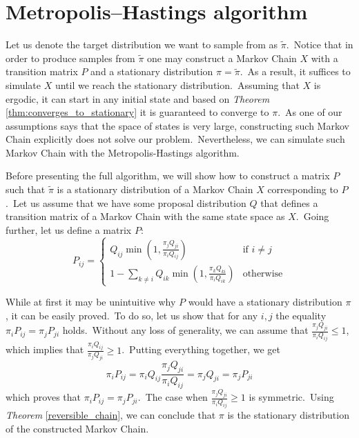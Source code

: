 \documentclass[a4paper, 11pt, onecolumn, openany, titlepage]{report}
\theoremstyle{default_theorem_style}\newtheorem{theorem}{Theorem}
\theoremstyle{default_theorem_style}\newtheorem{definition}{Definition}
\begin{document}
\section{Metropolis–Hastings algorithm}

Let us denote the target distribution we want to sample from as $\tilde{\pi}$.\ Notice that in order to produce samples
from $\tilde{\pi}$ one may construct a Markov Chain $X$ with a transition matrix $P$ and a stationary distribution
$\pi = \tilde{\pi}$.\ As a result, it suffices to simulate $X$ until we reach the stationary distribution.\ Assuming
that $X$ is ergodic, it can start in any initial state and based on \textit{Theorem} \ref{thm:converges_to_stationary}
it is guaranteed to converge to $\pi$.\ As one of our assumptions says that the space of states is very large,
constructing such Markov Chain explicitly does not solve our problem.\ Nevertheless, we can simulate such Markov Chain
with the Metropolis-Hastings algorithm.\newline

Before presenting the full algorithm, we will show how to construct a matrix $P$ such that $\tilde{\pi}$ is a
stationary distribution of a Markov Chain $X$ corresponding to $P$.\ Let us assume that we have some proposal
distribution $Q$ that defines a transition matrix of a Markov Chain with the same state space as $X$.\ Going further,
let us define a matrix $P$:\newline
$$
P_{ij} =
\begin{cases}
  Q_{ij}\min{(1, \frac{\pi_j Q_{ji}}{\pi_i Q_{ij}})} &\text{if $i \ne j$}\\
  1 - \sum\limits_{k \ne i}Q_{ik} \min{(1, \frac{\pi_k Q_{ki}}{\pi_i Q_{ik}})} &\text{otherwise}
\end{cases}
$$

While at first it may be unintuitive why $P$ would have a stationary distribution $\pi$, it can be easily
proved.\ To do so, let us show that for any $i, j$ the equality $\pi_i P_{ij} = \pi_j P_{ji}$ holds.\ Without
any loss of generality, we can assume that $\frac{\pi_j Q_{ji}}{\pi_i Q_{ij}} \leq 1$, which implies that
$\frac{\pi_i Q_{ij}}{\pi_j Q_{ji}} \geq 1$.\ Putting everything together, we get
$$
\pi_i P_{ij} = \pi_i Q_{ij} \frac{\pi_j Q_{ji}}{\pi_i Q_{ij}} = \pi_j Q_{ji} = \pi_j P_{ji}
$$
which proves that $\pi_i P_{ij} = \pi_j P_{ji}$.\ The case when $\frac{\pi_j Q_{ji}}{\pi_i Q_{ij}} \geq 1$ is
symmetric.\ Using \textit{Theorem} \ref{reversible_chain}, we can conclude that $\pi$ is the stationary distribution
of the constructed Markov Chain.\newline
\end{document}
